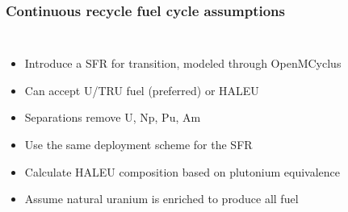 \begin{frame}
    \frametitle{Continuous recycle fuel cycle assumptions}
    \begin{columns}
        
    \column[t]{6cm}
    \vspace{-0.9cm}
    

        \column[t]{4.5cm}
        \begin{itemize}
            \item Introduce a \gls{SFR} for transition, modeled through 
                  OpenMCyclus
            \item Can accept U/TRU fuel (preferred) or \gls{HALEU}
            \item Separations remove U, Np, Pu, Am
            \item<2-> Use the same deployment scheme for the \gls{SFR}
            \item<2-> Calculate \gls{HALEU} composition based on plutonium
                      equivalence
            \item<3-> Assume natural uranium is enriched to produce all 
                  fuel
        \end{itemize}

\end{columns}
\end{frame}


